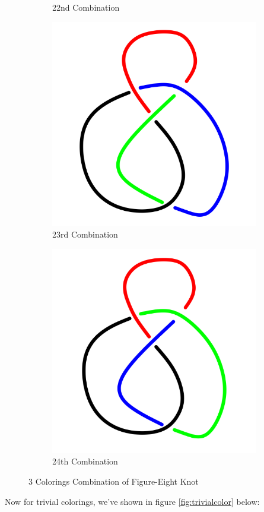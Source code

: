 \documentclass[a4paper,9pt]{article}
\begin{document}
\begin{enumerate}
\begin{figure}[h!]
\begin{subfigure}[b]{0.25\linewidth}
	\caption{22nd Combination}
\end{subfigure}
\qquad
\begin{subfigure}[b]{0.25\linewidth}
	\centering
	\includegraphics[width=0.5\linewidth]{picture/knotpict/knot-23}
	\caption{23rd Combination}
\end{subfigure}
\qquad
\begin{subfigure}[b]{0.25\linewidth}
	\centering
	\includegraphics[width=0.5\linewidth]{picture/knotpict/knot-24}
	\caption{24th Combination}
\end{subfigure}
\caption{3 Colorings Combination of Figure-Eight Knot}
\label{fig:coloring knot}
\end{figure}
\newpage
Now for trivial colorings, we've shown in figure \ref{fig:trivialcolor} below:\\
\begin{figure}[h!]
	\begin{subfigure}[b]{0.3\linewidth}
		\centering

\end{subfigure}
\end{figure}
\end{enumerate}
\end{document}
